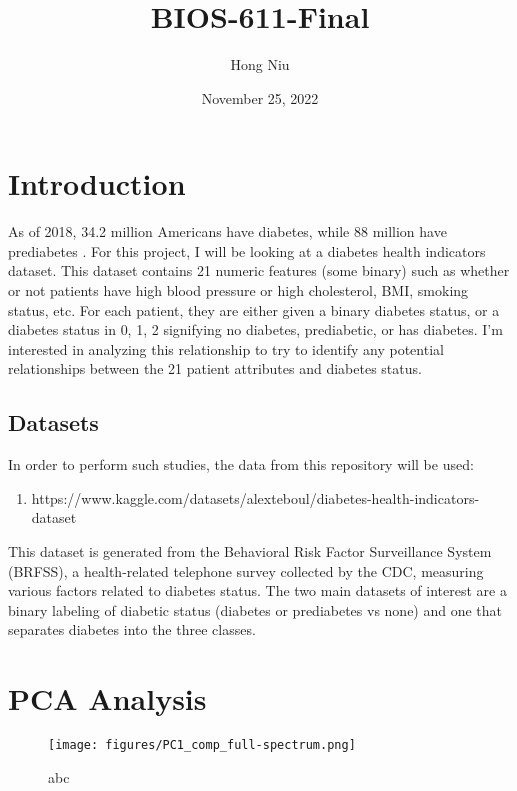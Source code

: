 \documentclass{article}
\title{BIOS-611-Final}
\author{Hong Niu}
\date{November 25, 2022}
\begin{document}
\maketitle

\section{Introduction}



As of 2018, 34.2 million Americans have diabetes, while 88 million have prediabetes \cite{dataset}. 
For this project, I will be looking at a diabetes health indicators dataset. This dataset contains 21 numeric features (some binary) such as whether or not patients have high blood pressure or high cholesterol, BMI, smoking status, etc. For each patient, they are either given a binary diabetes status, or a diabetes status in {0, 1, 2} signifying no diabetes, prediabetic, or has diabetes. I'm interested in analyzing this relationship to try to identify any potential relationships between the 21 patient attributes and diabetes status.


\subsection{Datasets} 

In order to perform such studies, the data from this repository will be used: 
  \begin{enumerate}
      \item https://www.kaggle.com/datasets/alexteboul/diabetes-health-indicators-dataset
  \end{enumerate}
This dataset is generated from the Behavioral Risk Factor Surveillance System (BRFSS), a health-related telephone survey collected by the CDC, measuring various factors related to diabetes status. The two main datasets of interest are a binary labeling of diabetic status (diabetes or prediabetes vs none) and one that separates diabetes into the three classes. 
   
   
\section{PCA Analysis} 
	\begin{figure}[ht]
		\begin{center} 
		\centering
			\texttt{[image: figures/PC1\_comp\_full-spectrum.png]}
			\caption{abc}
			\end{center}
		\end{figure}
\end{document}
